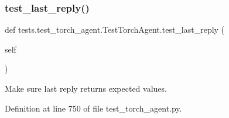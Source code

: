 \subsubsection{\texorpdfstring{test\+\_\+last\+\_\+reply()}{test\_last\_reply()}}
{\footnotesize\ttfamily def tests.\+test\+\_\+torch\+\_\+agent.\+Test\+Torch\+Agent.\+test\+\_\+last\+\_\+reply (\begin{DoxyParamCaption}\item[{}]{self }\end{DoxyParamCaption})}

\begin{DoxyVerb}Make sure last reply returns expected values.
\end{DoxyVerb}
 

Definition at line 750 of file test\+\_\+torch\+\_\+agent.\+py.


